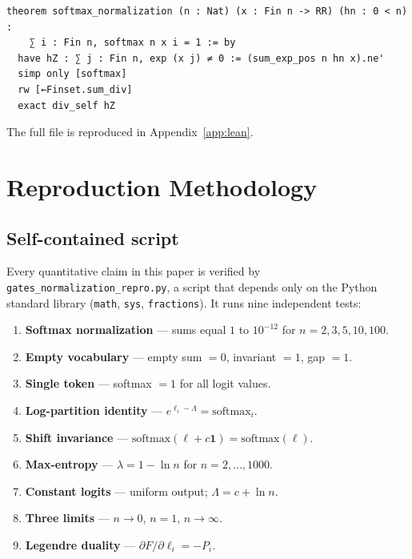 \documentclass[11pt]{article}
\newcommand{\softmax}{\mathrm{softmax}}
\begin{document}
\begin{lstlisting}[language=lean, caption={softmax\_normalization (excerpt).}]
theorem softmax_normalization (n : Nat) (x : Fin n -> RR) (hn : 0 < n) :
    ∑ i : Fin n, softmax n x i = 1 := by
  have hZ : ∑ j : Fin n, exp (x j) ≠ 0 := (sum_exp_pos n hn x).ne'
  simp only [softmax]
  rw [←Finset.sum_div]
  exact div_self hZ
\end{lstlisting}

The full file is reproduced in Appendix~\ref{app:lean}.

\section{Reproduction Methodology}
\label{sec:repro}

\subsection{Self-contained script}
\label{sec:repro-script}

Every quantitative claim in this paper is verified by
\texttt{gates\_normalization\_repro.py}, a script that depends only on the
Python standard library (\texttt{math}, \texttt{sys}, \texttt{fractions}). It
runs nine independent tests:

\begin{enumerate}
\item \textbf{Softmax normalization} --- sums equal $1$ to $10^{-12}$ for
$n=2,3,5,10,100$.
\item \textbf{Empty vocabulary} --- empty sum $=0$, invariant $=1$, gap $=1$.
\item \textbf{Single token} --- softmax $=1$ for all logit values.
\item \textbf{Log-partition identity} --- $e^{\ell_i-\Lambda}=\softmax_i$.
\item \textbf{Shift invariance} --- $\softmax(\ell+c\mathbf{1})=\softmax(\ell)$.
\item \textbf{Max-entropy} --- $\lambda = 1-\ln n$ for $n=2,\dots,1000$.
\item \textbf{Constant logits} --- uniform output; $\Lambda=c+\ln n$.
\item \textbf{Three limits} --- $n\to 0$, $n=1$, $n\to\infty$.
\item \textbf{Legendre duality} --- $\partial F/\partial\ell_i = -P_i$.
\end{enumerate}
\end{document}
